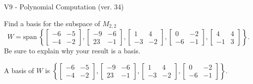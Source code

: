 \begin{exercise}
  \begin{exerciseTitle}V9 - Polynomial Computation (ver. 34)\end{exerciseTitle}
  \begin{exerciseStatement}
    Find a basis for the subspace of \(M_{2,2}\) 
\[W=\mathrm{span}\ \left\{\left[\begin{array}{cc}
-6 & -5 \\
-4 & -2
\end{array}\right] , \left[\begin{array}{cc}
-9 & -6 \\
23 & -1
\end{array}\right] , \left[\begin{array}{cc}
1 & 4 \\
-3 & -2
\end{array}\right] , \left[\begin{array}{cc}
0 & -2 \\
-6 & -1
\end{array}\right] , \left[\begin{array}{cc}
4 & 4 \\
-1 & 3
\end{array}\right]\right\}.\]
 Be sure to explain why your result is a basis.


  \end{exerciseStatement}
  \begin{exerciseAnswer}
   A basis of \(W\) is  \(\left\{\left[\begin{array}{cc}
-6 & -5 \\
-4 & -2
\end{array}\right] , \left[\begin{array}{cc}
-9 & -6 \\
23 & -1
\end{array}\right] , \left[\begin{array}{cc}
1 & 4 \\
-3 & -2
\end{array}\right] , \left[\begin{array}{cc}
0 & -2 \\
-6 & -1
\end{array}\right]\right\}\).
  


  \end{exerciseAnswer}
\end{exercise}